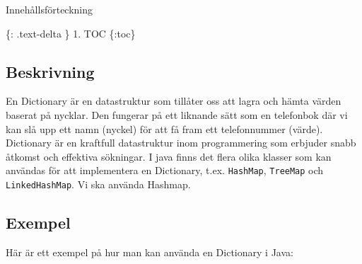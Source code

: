 Innehållsförteckning

\{: .text-delta \} 1. TOC \{:toc\}

\hypertarget{beskrivning}{%
\subsection{Beskrivning}\label{beskrivning}}

En Dictionary är en datastruktur som tillåter oss att lagra och hämta
värden baserat på nycklar. Den fungerar på ett liknande sätt som en
telefonbok där vi kan slå upp ett namn (nyckel) för att få fram ett
telefonnummer (värde). Dictionary är en kraftfull datastruktur inom
programmering som erbjuder snabb åtkomst och effektiva sökningar. I java
finns det flera olika klasser som kan användas för att implementera en
Dictionary, t.ex. \texttt{HashMap}, \texttt{TreeMap} och
\texttt{LinkedHashMap}. Vi ska använda Hashmap.

\hypertarget{exempel}{%
\subsection{Exempel}\label{exempel}}

Här är ett exempel på hur man kan använda en Dictionary i Java:

